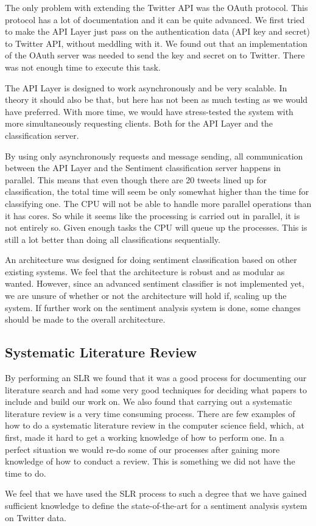 The only problem with extending the Twitter API was the OAuth protocol. This protocol has a lot of documentation and it can be quite advanced. We first tried to make the API Layer just pass on the authentication data (API key and secret) to Twitter API, without meddling with it. We found out that an implementation of the OAuth server was needed to send the key and secret on to Twitter. There was not enough time to execute this task. 

The API Layer is designed to work asynchronously and be very scalable. In theory it should also be that, but here has not been as much testing as we would have preferred. With more time, we would have stress-tested the system with more simultaneously requesting clients. Both for the API Layer and the classification server. 

By using only asynchronously requests and message sending, all communication between the API Layer and the Sentiment classification server happens in parallel. This means that even though there are 20 tweets lined up for classification, the total time will seem be only somewhat higher than the time for classifying one. The CPU will not be able to handle more parallel operations than it has cores. So while it seems like the processing is carried out in parallel, it is not entirely so. Given enough tasks the CPU will queue up the processes. This is still a lot better than doing all classifications sequentially. 

An architecture was designed for doing sentiment classification based on other existing systems. We feel that the architecture is robust and as modular as wanted. However, since an advanced sentiment classifier is not implemented yet, we are unsure of whether or not the architecture will hold if, scaling up the system. If further work on the sentiment analysis system is done, some changes should be made to the overall architecture. 


\subsection{Systematic Literature Review}

By performing an SLR we found that it was a good process for documenting our literature search and had some very good techniques for deciding what papers to include and build our work on. We also found that carrying out a systematic literature review is a very time consuming process. There are few examples of how to do a systematic literature review in the computer science field, which, at first, made it hard to get a working knowledge of how to perform one. In a perfect situation we would re-do some of our processes after gaining more knowledge of how to conduct a review. This is something we did not have the time to do. 

We feel that we have used the SLR process to such a degree that we have gained sufficient knowledge to define the state-of-the-art for a sentiment analysis system on Twitter data. 
